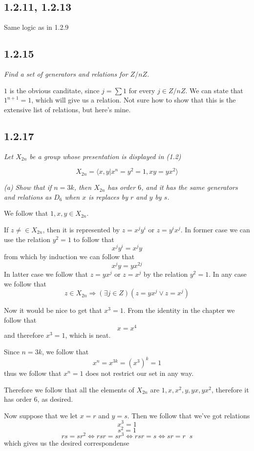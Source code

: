 \documentclass[11pt,oneside,titlepage]{book}
\DeclareMathOperator \inv {^{-1}}
\DeclareMathOperator \lra {\Leftrightarrow}
\DeclareMathOperator \ra {\Rightarrow}
\newcommand{\eangle}[1]{\langle #1 \rangle}
\begin{document}
\subsection*{1.2.11, 1.2.13}

Same logic as in 1.2.9

\subsection*{1.2.15}

\textit{Find a set of generators and relations for $Z/nZ$.}

$1$ is the obvious canditate, since $j = \sum 1$ for every $j \in Z/nZ$.
We can state that $1^{n + 1} = 1$, which will give us a relation. Not sure how to
show that this is the extensive list of relations, but here's mine.

\subsection*{1.2.17}

\textit{Let $X_{2n}$ be a group whose presentation is displayed in (1.2)}

$$X_{2n} = \eangle{x, y | x^n = y^2  = 1, xy = yx^2}$$

\textit{(a) Show that if $n = 3k$, then $X_{2n}$ has order $6$, and it has the same generators
  and relations as $D_6$ when $x$ is replaces by $r$ and $y$ by $s$.}

We follow that $1, x, y \in X_{2n}$.

If $z \neq  \in X_{2n}$, then it is represented by $z = x^j y^i$ or $z = y^i x^j$. In former
case we can use the relation $y^2 = 1$ to follow that
$$x^j y^i = x^j y$$
from which by induction we can follow that
$$x^j y = y x^{2j}$$
In latter case we follow that $z = yx^j$ or $z = x^j$ by the relation $y^2 = 1$.
In any case we follow that
$$z \in X_{2n} \ra (\exists j \in Z)(z = y x^j \lor z = x^j)$$

Now it would be nice to get that $x^3 = 1$.
From the identity in the chapter we follow that
$$x = x^4$$
and therefore $x^3 = 1$, which is neat.

Since $n = 3k$, we follow that
$$x^n = x^{3k} = (x^3)^k = 1$$
thus we follow that $x^n = 1$ does not restrict our set in any way.

Therefore we follow that all the elements of $X_{2n}$ are $1, x, x^2, y, yx, yx^2$, therefore
it has order $6$, as desired.


Now suppose that we let $x = r$ and $y = s$. Then we follow that we've got relations
$$x^3 = 1$$
$$s^2 = 1$$
$$rs = sr^2 \lra rsr = sr^3 \lra rsr = s \lra sr = r \inv s$$
which gives us the desired correspondense
\end{document}
